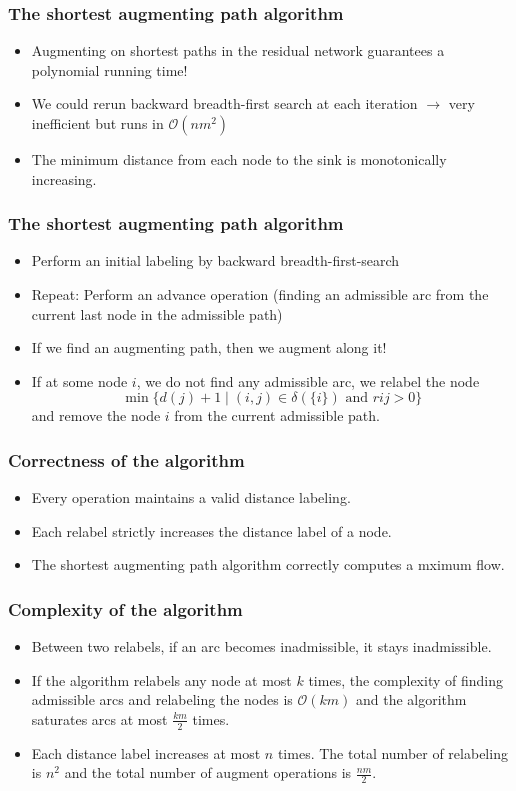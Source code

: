 \documentclass[9pt]{beamer}
\begin{document}
\begin{frame}
\frametitle{The shortest augmenting path algorithm}
\begin{itemize}
\item<1-> Augmenting on shortest paths in the residual network guarantees
a \alert{polynomial running time}!
\item<1-> We could rerun backward breadth-first search at \alert{each iteration}
$\rightarrow$ very inefficient but runs in $\mathcal O(nm^2)$
\item<1-> The minimum distance from each node to the sink is 
\alert{monotonically increasing}. 
\end{itemize}
\end{frame}
\begin{frame}
\frametitle{The shortest augmenting path algorithm}
\begin{itemize}
\item Perform an \alert{initial labeling} by backward breadth-first-search
\item Repeat: Perform an \alert{advance operation} (finding an admissible arc from the 
current last node in the admissible path)
\item If we find an augmenting path, then we augment along it!
\item If at some node $i$, we do not find any admissible arc, we \alert{relabel} the node
$$\min\{d(j)+1\mid (i,j)\in \delta(\{i\})\text{ and } r{ij}>0\}$$
and remove the node $i$ from the current admissible path.
\end{itemize}
\end{frame}
\begin{frame}
\frametitle{Correctness of the algorithm}
\begin{itemize}
\item Every operation maintains a \alert{valid distance labeling}.\bigskip
\item Each relabel strictly increases the distance label of a node.\bigskip
\item The shortest augmenting path algorithm correctly computes a mximum flow.
\end{itemize}
\end{frame}
\begin{frame}
\frametitle{Complexity of the algorithm}
\begin{itemize}
\item Between two \alert{relabels}, if an arc becomes inadmissible, 
it stays inadmissible.\bigskip
\item If the algorithm relabels any node at most $k$ times, the complexity
of finding admissible arcs and relabeling the nodes is $\mathcal O(km)$
and the algorithm saturates arcs at most $\frac{km}{2}$ times.\bigskip
\item Each distance label increases at most $n$ times. The total number of relabeling
is $n^2$ and the total number of augment operations is $\frac{nm}{2}$.
\end{itemize}
\end{frame}
\end{document}
